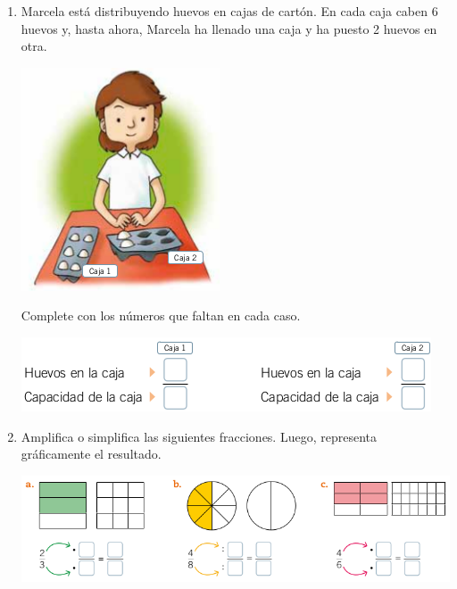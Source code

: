 \documentclass[fleqn]{article}
\begin{document}
\begin{enumerate}
\begin{enumerate}
 \end{enumerate}
 \item \begin{minipage}{.6\textwidth}
 Marcela está distribuyendo huevos en cajas de cartón. En cada caja caben 6 huevos y, hasta ahora, Marcela ha llenado una caja y ha puesto 2 huevos en otra.  
 \end{minipage}\hfill
\begin{minipage}{.4\textwidth}
\includegraphics[scale=.4]{Images/Marcela.png} 
\end{minipage}
Complete con los números que faltan en cada caso.
\begin{center}
 \includegraphics[scale=.5]{Images/Huevos.png} 
\end{center}
 \noanswer
  \item Amplifica o simplifica las siguientes fracciones. Luego, representa gráficamente el resultado.
\begin{center}
 \includegraphics[scale=.4]{Images/AmpSimpFracc.png} 
 \end{center} 
 \noanswer
 \end{enumerate}
\end{document}
